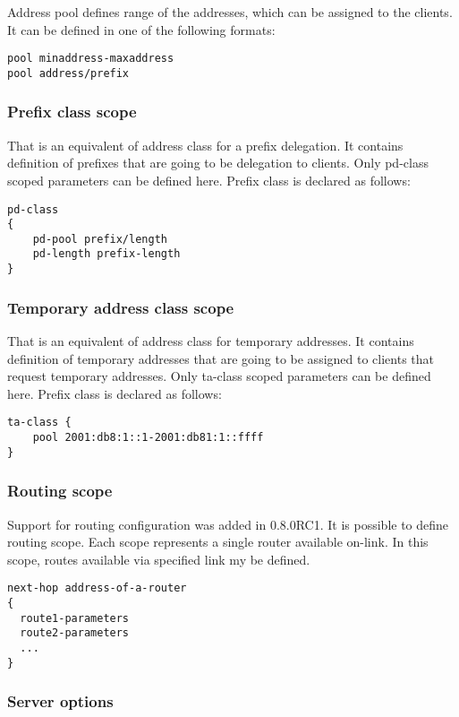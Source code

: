 Address pool defines range of the addresses, which can be assigned to the
clients. It can be defined in one of the following formats:
\begin{lstlisting}
pool minaddress-maxaddress
pool address/prefix
\end{lstlisting}

\subsubsection{Prefix class scope}
\label{server-pd-class-scope}
That is an equivalent of address class for a prefix delegation. It
contains definition of prefixes that are going to be delegation to
clients. Only pd-class scoped parameters can be defined here. Prefix
class is declared as follows:
\begin{lstlisting}
pd-class
{
    pd-pool prefix/length
    pd-length prefix-length
}
\end{lstlisting}

\subsubsection{Temporary address class scope}
\label{server-ta-class-scope}
That is an equivalent of address class for temporary addresses. It
contains definition of temporary addresses that are going to be
assigned to clients that request temporary addresses. Only ta-class
scoped parameters can be defined here. Prefix class is declared as
follows: 
\begin{lstlisting}
ta-class {
    pool 2001:db8:1::1-2001:db81:1::ffff
}
\end{lstlisting}

\subsubsection{Routing scope}
\label{server-route-scope}
Support for routing configuration was added in 0.8.0RC1. It is
possible to define routing scope. Each scope represents a single
router available on-link. In this scope, routes available via
specified link my be defined.

\begin{lstlisting}
next-hop address-of-a-router
{
  route1-parameters
  route2-parameters
  ...
}
\end{lstlisting}

\subsubsection{Server options}

